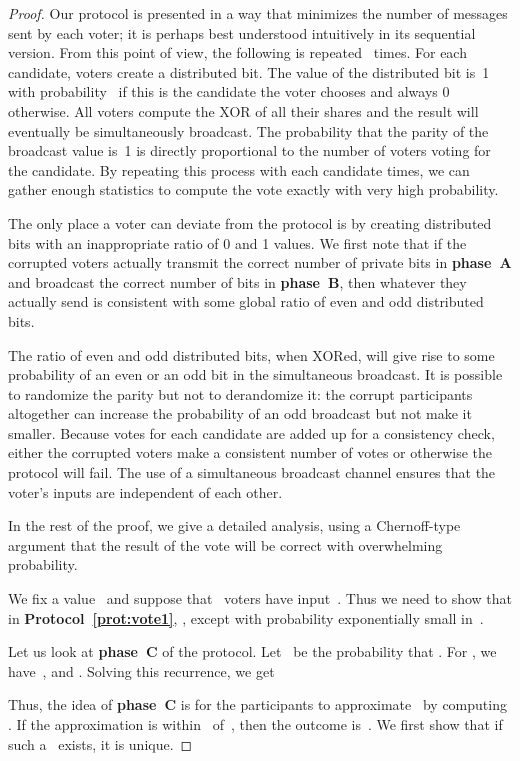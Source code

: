 \documentclass[runningheads]{llncs}
\begin{document}
\begin{proof}
Our protocol is presented in a way that minimizes the number of
messages sent by each voter; it is perhaps best understood
intuitively in its sequential version. From this point of view, the
following is repeated~ times. For each candidate, voters
create a distributed bit. The value of the distributed bit is~1 with
probability~ if this is the candidate the voter chooses  and
always 0 otherwise. All voters compute the XOR of all their shares
and the result will eventually be simultaneously broadcast. The
probability that the parity of the broadcast value is~1 is directly
proportional to the number of voters voting for the candidate. By
repeating this process with each candidate  times, we can
gather enough statistics to compute the vote exactly with very high
probability.

The only place a voter can deviate from the protocol is by creating
distributed bits with an inappropriate ratio of 0 and 1 values. We
first note that if the corrupted voters actually transmit the
correct number of private bits in \textbf{phase~A} and broadcast the
correct number of bits in \textbf{phase~B}, then whatever they
actually send is consistent with some global ratio of even and odd
distributed bits.

The ratio of even and odd distributed bits, when XORed, will give
rise to some probability of an even or an odd bit in the
simultaneous broadcast. It is possible to randomize the parity but
not to derandomize it: the corrupt participants altogether can
increase the probability of an odd broadcast but not make it
smaller. Because votes for each candidate are added up for a
consistency check, either the corrupted voters make a consistent
number of votes or otherwise the protocol will fail. The use of a simultaneous broadcast channel ensures that the voter's
inputs are independent of each other.

In the rest of the proof, we give a detailed analysis, using a
Chernoff-type argument that the result of the vote will be correct
with overwhelming probability.

We fix a value~ and suppose that~ voters have input~.
Thus we need to show that  in \textbf{Protocol~\ref{prot:vote1}},
,  except with probability exponentially small in~.

Let us look at \textbf{phase~C} of the protocol. Let~ be the
probability that . For  , we have~,
 and . Solving this recurrence, we get

Thus, the idea of \textbf{phase~C} is for the participants to
approximate~ by computing \mbox{}.
 If the approximation
is within~ of~, then the outcome is~.
 We first show that if such a~ exists, it is
unique.


\end{proof}
\end{document}
